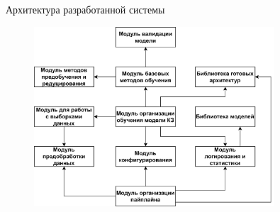 \documentclass[10pt]{beamer}
\begin{document}
        \begin{frame}{Архитектура разработанной системы}
            \begin{figure}[H]
                \centering
                \includegraphics[width=0.8\textwidth]{pic4-0.jpg}
            \end{figure}
        \end{frame}
\end{document}
